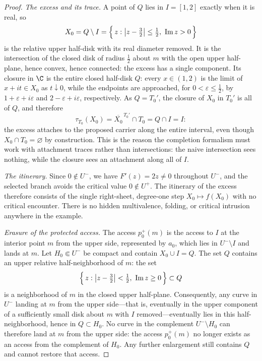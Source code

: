 \begin{proof}
\emph{The excess and its trace.}
A point of $Q$ lies in $I=[1,2]$ exactly when it is real, so
\[
X_0=Q\setminus I
=\Bigl\{\,z:\bigl|z-\tfrac32\bigr|\le\tfrac12,\ \operatorname{Im}z>0\,\Bigr\}
\]
is the relative upper half-disk with its real diameter removed. It is the
intersection of the closed disk of radius $\tfrac12$ about $m$ with the open
upper half-plane, hence convex, hence connected: the excess has a single
component. Its closure in $\C$ is the entire closed half-disk
$Q$: every $x\in(1,2)$ is the limit of $x+it\in X_0$ as
$t\downarrow0$, while the endpoints are approached, for
$0<\varepsilon\le\tfrac12$, by
$1+\varepsilon+i\varepsilon$ and
$2-\varepsilon+i\varepsilon$, respectively.  As $Q=T_0'$, the closure of
$X_0$ in $T_0'$ is all of $Q$,
and therefore
\[
\tau_{T_0}(X_0)=\overline{X_0}^{\,T_0'}\cap T_0=Q\cap I=I:
\]
the excess attaches to the proposed carrier along the entire interval, even
though $X_0\cap T_0=\varnothing$ by construction. This is the reason the
completion formalism must work with attachment traces rather than
intersections: the naive intersection sees nothing, while the closure sees an
attachment along all of $I$.

\emph{The itinerary.}
Since $0\notin U^{-}$, we have $F'(z)=2z\ne 0$ throughout $U^{-}$, and the
selected branch avoids the critical value $0\notin U^{+}$. The itinerary of
the excess therefore consists of the single right-sheet, degree-one step
$X_0\mapsto f(X_0)$ with no critical encounter.
There is no hidden multivalence, folding, or critical intrusion anywhere in
the example.

\emph{Erasure of the protected access.}
The access $p_0^{+}(m)$ is the access to $I$ at the interior point $m$ from
the upper side, represented by $a_0$, which lies in
$U^{-}\setminus I$ and lands at $m$.  Let
$H_0\Subset U^{-}$ be compact and contain $X_0\cup I=Q$.  The set $Q$ contains an
upper relative half-neighborhood of $m$: the set
\[
\Bigl\{\,z:\bigl|z-\tfrac32\bigr|<\tfrac12,\ \operatorname{Im}z\ge 0\,\Bigr\}
\subset Q
\]
is a neighborhood of $m$ in the closed upper half-plane. Consequently, any
curve in $U^{-}$ landing at $m$ from the upper side---that is, eventually
in the upper component of a sufficiently small disk about $m$ with $I$
removed---eventually lies in this half-neighborhood, hence in $Q\subset H_0$.
No curve in the complement $U^{-}\setminus H_0$ can therefore land at $m$ from the upper
side: the access $p_0^{+}(m)$ no longer exists as an access from the
complement of $H_0$.  Any further enlargement still contains $Q$ and
cannot restore that access.


\end{proof}
